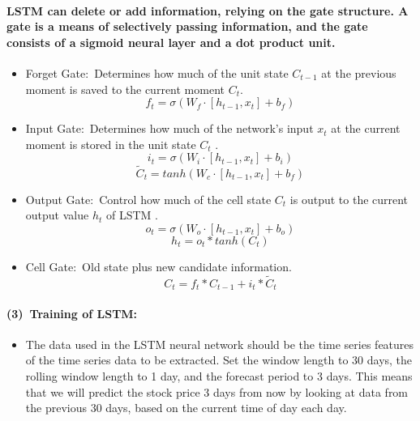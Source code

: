 \documentclass{mcmthesis}
\begin{document}
	\paragraph{LSTM can delete or add information, relying on the gate structure. A gate is a means of selectively passing information, and the gate consists of a sigmoid neural layer and a dot product unit. }
	\begin{itemize}
		\item Forget Gate:\ Determines how much of the unit state $C_{t-1}$ at the previous moment is saved to the current moment $C_{t}$.  
		\begin{equation}
			f_{t}=\sigma(W_{f}\cdot[h_{t-1},x_{t}]+b_{f})
		\end{equation}
		\item Input Gate:\ Determines how much of the network's input $x_{t}$ at the current moment is stored in the unit state $C_{t}$ . 
		\begin{equation}
			i_{t}=\sigma(W_{i}\cdot[h_{t-1},x_{t}]+b_{i})
		\end{equation}
		\begin{equation}
			\widetilde C_{t}=tanh(W_{c}\cdot[h_{t-1},x_{t}]+b_{f})
		\end{equation}
		\item Output Gate:\ Control how much of the cell state $C_{t}$ is output to the current output value $h_{t}$ of LSTM .
		\begin{equation}
			o_{t}=\sigma(W_{o}\cdot[h_{t-1},x_{t}]+b_{o})
		\end{equation}
		\begin{equation}
			h_{t}=o_{t}*tanh(C_{t})
		\end{equation}
		\item Cell Gate:\ Old state plus new candidate information.
		\begin{equation}
			C_{t}=f_{t}*C_{t-1}+i_{t}*\widetilde C_{t}
		\end{equation}
		
		
		
	\end{itemize}
	
	
	
	\paragraph{(3)\ Training of LSTM: }
	\begin{itemize}
		\item The data used in the LSTM neural network should be the time series features of the time series data to be extracted. Set the window length to 30 days, the rolling window length to 1 day, and the forecast period to 3 days. This means that we will predict the stock price 3 days from now by looking at data from the previous 30 days, based on the current time of day each day. 
		
	\end{itemize}
	
\end{document}
